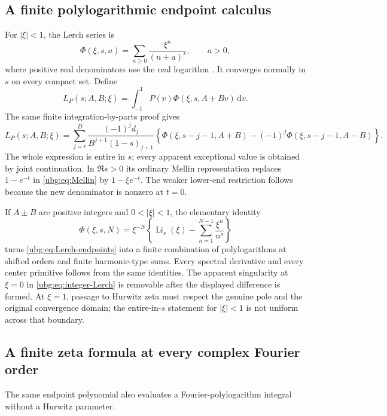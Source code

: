 \documentclass[11pt,letterpaper]{article}
\numberwithin{equation}{section}
\theoremstyle{definition}\newtheorem{definition}[theorem]{Definition}
\theoremstyle{remark}\newtheorem{remark}[theorem]{Remark}
\newcommand{\dd}{\,\mathrm d}\newcommand{\ii}{\mathrm i}
\DeclareMathOperator{\Li}{Li}\DeclareMathOperator{\FP}{FP}
\begin{document}
\subsection{A finite polylogarithmic endpoint calculus}
For $|\xi|<1$, the Lerch series is
\[
 \Phi(\xi,s,a)=\sum_{n\ge0}\frac{\xi^n}{(n+a)^s},\qquad a>0,
\]
where positive real denominators use the real logarithm
\cite{DLMFlerch}. It converges normally in $s$ on every compact set.
Define
\begin{equation}\label{ubg:eq:Lerch-transform}
 L_P(s;A,B;\xi)=\int_{-1}^1P(v)\Phi(\xi,s,A+Bv)\dd v.
\end{equation}
The same finite integration-by-parts proof gives
\begin{equation}\label{ubg:eq:Lerch-endpoints}
 L_P(s;A,B;\xi)=\sum_{j=r}^D
 \frac{(-1)^jd_j}{B^{j+1}(1-s)_{j+1}}
 \left\{\Phi(\xi,s-j-1,A+B)-(-1)^j\Phi(\xi,s-j-1,A-B)\right\}.
\end{equation}
The whole expression is entire in $s$; every apparent exceptional value
is obtained by joint continuation. In $\Re s>0$ its ordinary Mellin
representation replaces $1-e^{-t}$ in \eqref{ubg:eq:Mellin} by
$1-\xi e^{-t}$. The weaker lower-end restriction follows because the
new denominator is nonzero at $t=0$.

If $A\pm B$ are positive integers and $0<|\xi|<1$, the elementary identity
\begin{equation}\label{ubg:eq:integer-Lerch}
 \Phi(\xi,s,N)=\xi^{-N}
 \left\{\Li_s(\xi)-\sum_{n=1}^{N-1}\frac{\xi^n}{n^s}\right\}
\end{equation}
turns \eqref{ubg:eq:Lerch-endpoints} into a finite combination of
polylogarithms at shifted orders and finite harmonic-type sums.
Every spectral derivative and every center primitive follows from the
same identities. The apparent singularity at $\xi=0$ in
\eqref{ubg:eq:integer-Lerch} is removable after the displayed difference
is formed. At $\xi=1$, passage to Hurwitz zeta must respect the genuine
pole and the original convergence domain; the entire-in-$s$ statement
for $|\xi|<1$ is not uniform across that boundary.

\subsection{A finite zeta formula at every complex Fourier order}
The same endpoint polynomial also evaluates a Fourier-polylogarithm
integral without a Hurwitz parameter.
\end{document}
